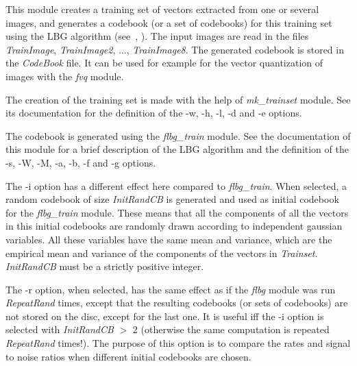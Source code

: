 This module creates a training set of vectors extracted from one or several 
images, and generates a codebook (or a set of codebooks)
for this training set using the LBG algorithm (see~\cite{gersho.gray:vector}, 
\cite{linde.buzo.ea:algorithm}). The input images are read 
in the files {\em TrainImage}, {\em TrainImage2}, ..., {\em TrainImage8}. 
The generated codebook is stored in the {\em CodeBook} file. 
It can be used for example for the vector quantization of images 
with the {\em fvq} module. 

The creation of the training set is made with the help of {\em mk\_trainset} 
module. See its documentation for the definition of the -w, -h, -l, -d and -e 
options. 

The codebook is generated using the {\em flbg\_train} module. See the 
documentation of this module for a brief description of the LBG algorithm 
and the definition of the -s, -W, -M, -a, -b, -f and -g options. 

The -i option has a different effect here compared to {\em flbg\_train}. 
When selected, a random codebook of size {\em InitRandCB} is generated 
and used as initial codebook for the {\em flbg\_train} module. 
These means that all the components of all the vectors in this initial 
codebooks are randomly drawn according to independent gaussian variables. 
All these variables have the same mean and variance, which are the 
empirical mean and variance of the components of the vectors 
in {\em Trainset}. {\em InitRandCB} must be a strictly positive integer. 

The -r option, when selected, has the same effect as if the {\em flbg} 
module was run {\em RepeatRand} times, except that the resulting 
codebooks (or sets of codebooks) are not stored on the disc, 
except for the last one. 
It is useful iff the -i option is selected with {\em InitRandCB} $>$ 2 
(otherwise the same computation is repeated {\em RepeatRand} times!). 
The purpose of this option is to compare the rates and signal to noise ratios 
when different initial codebooks are chosen.
